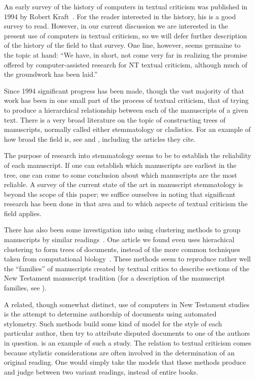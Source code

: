 \documentclass[onecolumn, 12pt]{article}
\begin{document}
An early survey of the history of computers in textual criticism was published
in 1994 by Robert
Kraft~\cite{kraft-1994-computers-in-new-testament-textual-criticism}.  For the
reader interested in the history, his is a good survey to read.  However, in
our current discussion we are interested in the present use of computers in
textual criticism, so we will defer further description of the history of the
field to that survey.  One line, however, seems germaine to the topic at hand:
``We have, in short, not come very far in realizing the promise offered by
computer-assisted research for NT textual criticism, although much of the
groundwork has been laid.''

Since 1994 significant progress has been made, though the vast majority of that
work has been in one small part of the process of textual criticism, that of
trying to produce a hierarchical relationship between each of the manuscripts
of a given text.  There is a very broad literature on the topic of constructing
trees of manuscripts, normally called either stemmatology or cladistics.  For
an example of how broad the field is, see
\cite{spencer-2002-exploring-textual-genealogy} and
\cite{van-reenen-2004-studies-in-stemmatology-ii}, including the articles they
cite.

The purpose of research into stemmatology seems to be to establish the
reliability of each manuscript.  If one can establish which manuscripts are
earliest in the tree, one can come to some conclusion about which manuscripts
are the most reliable.  A survey of the current state of the art in manuscript
stemmatology is beyond the scope of this paper; we suffice ourselves in noting
that significant research has been done in that area and to which aspects of
textual criticism the field applies.

There has also been some investigation into using clustering methods to group
manuscripts by similar readings~\cite{willker-pca-of-manuscripts-of-john}.  One
article we found even uses hierachical clustering to form trees of documents,
instead of the more common techniques taken from computational
biology~\cite{thorpe-2002-statistical-manuscript-classification}.  These
methods seem to reproduce rather well the ``families'' of manuscripts created
by textual critics to describe sections of the New Testament manuscript
tradition (for a description of the manuscript families, see
\cite[212--218]{metzger-1992-text-of-the-new-testament}).

A related, though somewhat distinct, use of computers in New Testament studies
is the attempt to determine authorship of documents using automated stylometry.
Such methods build some kind of model for the style of each particular author,
then try to attribute disputed documents to one of the authors in question.
\cite{alviar-2008-computational-linguistics-and-biblical-studies} is an example
of such a study.  The relation to textual criticism comes because stylistic
considerations are often involved in the determination of an original reading.
One would simply take the models that these methods produce and judge between
two variant readings, instead of entire books.
\end{document}
